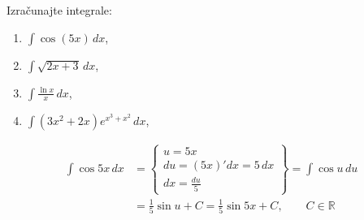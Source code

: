 \begin{example}
    Izračunajte integrale:
    \begin{enumerate}
        \item $\displaystyle \int \cos (5x)\,dx$,
        \item $\displaystyle \int \sqrt{2x + 3}\,dx$,
        \item $\displaystyle \int \frac{\ln x}{x}\,dx$,
        \item $\displaystyle \int (3x^2+2x)e^{x^3+x^2}\,dx$,
    \end{enumerate}
\end{example}

\begin{align*}
\int \cos 5x\,dx &= \begin{Bmatrix} u = 5x \\ du = (5x)'dx = 5\,dx \\ dx = \frac{du}{5} \end{Bmatrix} = \int \cos u\,du \\
                 &= \frac{1}{5}\sin u + C = \frac{1}{5}\sin 5x + C, \qquad C \in \mathbb{R}
\end{align*}

